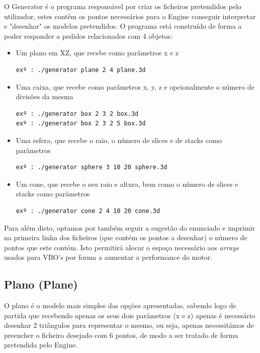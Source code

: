 \documentclass{article}
\begin{document}
O Generator é o programa responsável por criar os ficheiros pretendidos pelo utilizador, estes contêm os pontos necessários para o Engine conseguir interpretar e "desenhar" os modelos pretendidos.
O programa está construído de forma a poder responder a pedidos relacionados com 4 objetos:
\begin{itemize}
    \item Um plano em XZ, que recebe como parâmetros x e z
        \begin{verbatim}
exº : ./generator plane 2 4 plane.3d
        \end{verbatim}
    \item Uma caixa, que recebe como parâmetros x, y, z e opcionalmente o número de divisões da mesma
        \begin{verbatim}
exº : ./generator box 2 3 2 box.3d
exº : ./generator box 2 3 2 5 box.3d
        \end{verbatim}
    \item Uma esfera, que recebe o raio, o número de slices e de stacks como parâmetros
        \begin{verbatim}
exº : ./generator sphere 3 10 20 sphere.3d
        \end{verbatim}
    \item Um cone, que recebe o seu raio e altura, bem como o número de slices e stacks como parâmetros
        \begin{verbatim}
exº : ./generator cone 2 4 10 20 cone.3d
        \end{verbatim}
\end{itemize}
Para além disto, optamos por também seguir a sugestão do enunciado e imprimir na primeira linha dos ficheiros (que contém os pontos a desenhar) o número de pontos que este contém. Isto permitirá alocar o espaço necessário aos \textit{arrays} usados para VBO's por forma a aumentar a performance do motor.

\subsection{Plano (Plane)}

O plano é o modelo mais simples das opções apresentadas, sabendo logo de partida que recebendo apenas os seus dois parâmetros (x e z) apenas é necessário desenhar 2 triângulos para representar o mesmo, ou seja, apenas necessitámos de preencher o ficheiro desejado com 6 pontos, de modo a ser tratado de forma pretendida pelo Engine.
\end{document}
